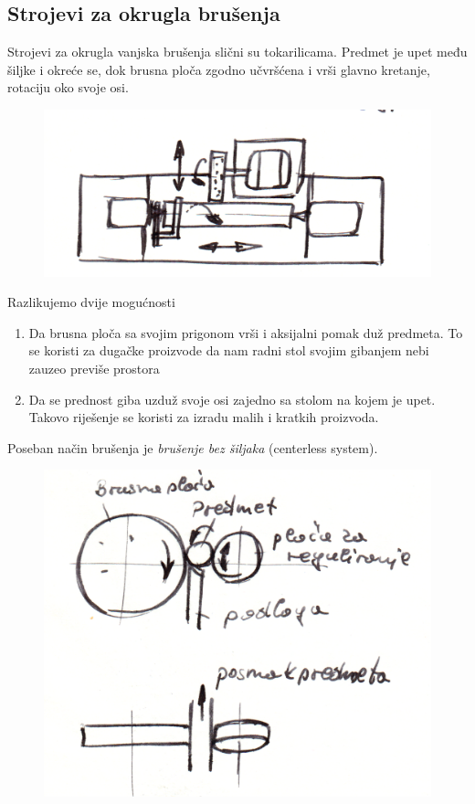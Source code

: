 \documentclass[a4paper,12pt]{article}
\numberwithin{figure}{section}
\begin{document}
\subsection{Strojevi za okrugla brušenja}
Strojevi za okrugla vanjska brušenja slični su tokarilicama. Predmet je upet među šiljke i okreće se, dok brusna ploča zgodno učvršćena i vrši glavno kretanje, rotaciju oko svoje osi. \par
\begin{figure}[!h]
\begin{flushleft}
\includegraphics[scale=0.15]{image_30-1.png}
\end{flushleft}
\end{figure}
\FloatBarrier
Razlikujemo dvije mogućnosti
\begin{enumerate}
\item Da brusna ploča sa svojim prigonom vrši i aksijalni pomak duž predmeta. To se koristi za dugačke proizvode da nam radni stol svojim gibanjem nebi zauzeo previše prostora
\item Da se prednost giba uzduž svoje osi zajedno sa stolom na kojem je upet. Takovo riješenje se koristi za izradu malih i kratkih proizvoda.
\end{enumerate}
Poseban način brušenja je \textit{brušenje bez šiljaka} (centerless system). 
\begin{figure}[!h]
\centering
\includegraphics[scale=0.15]{image_30-2.png}
\end{figure}
\end{document}
